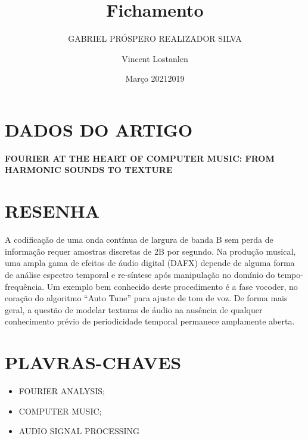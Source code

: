 \documentclass{article}
\title{Fichamento}
\author{GABRIEL PRÓSPERO REALIZADOR  SILVA}
\date{Março 2021}
\begin{document}
\maketitle

\section{DADOS DO ARTIGO}
\textbf{FOURIER AT THE HEART OF COMPUTER MUSIC: FROM HARMONIC SOUNDS TO TEXTURE \\}
\author{Vincent Lostanlen \\}
\date{2019}

\section{RESENHA}
A codificação de uma onda contínua de largura de banda B sem perda de informação requer amostras discretas de 2B por segundo. Na produção musical, uma ampla gama de efeitos de áudio digital (DAFX) depende de alguma forma de análise espectro temporal e re-síntese após manipulação no domínio do tempo-frequência. Um exemplo bem conhecido deste procedimento é a fase vocoder, no coração do algoritmo “Auto Tune” para ajuste de tom de voz. De forma mais geral, a questão de modelar texturas de áudio na ausência de qualquer conhecimento prévio de periodicidade temporal permanece amplamente aberta.

\section{PLAVRAS-CHAVES}
\begin{itemize}
    \item FOURIER ANALYSIS; 
    \item COMPUTER MUSIC; 
    \item AUDIO SIGNAL PROCESSING
\end{itemize}
\end{document}
